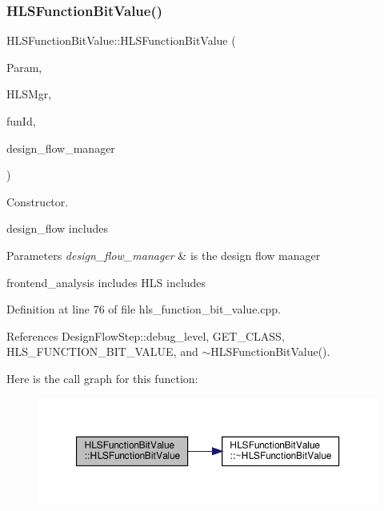 \subsubsection{\texorpdfstring{H\+L\+S\+Function\+Bit\+Value()}{HLSFunctionBitValue()}}
{\footnotesize\ttfamily H\+L\+S\+Function\+Bit\+Value\+::\+H\+L\+S\+Function\+Bit\+Value (\begin{DoxyParamCaption}\item[{const \hyperlink{Parameter_8hpp_a37841774a6fcb479b597fdf8955eb4ea}{Parameter\+Const\+Ref}}]{Param,  }\item[{const \hyperlink{hls__manager_8hpp_acd3842b8589fe52c08fc0b2fcc813bfe}{H\+L\+S\+\_\+manager\+Ref}}]{H\+L\+S\+Mgr,  }\item[{unsigned int}]{fun\+Id,  }\item[{const Design\+Flow\+Manager\+Const\+Ref}]{design\+\_\+flow\+\_\+manager }\end{DoxyParamCaption})}



Constructor. 

design\+\_\+flow includes


\begin{DoxyParams}{Parameters}
{\em design\+\_\+flow\+\_\+manager} & is the design flow manager\\
\hline
\end{DoxyParams}
frontend\+\_\+analysis includes H\+LS includes 

Definition at line 76 of file hls\+\_\+function\+\_\+bit\+\_\+value.\+cpp.



References Design\+Flow\+Step\+::debug\+\_\+level, G\+E\+T\+\_\+\+C\+L\+A\+SS, H\+L\+S\+\_\+\+F\+U\+N\+C\+T\+I\+O\+N\+\_\+\+B\+I\+T\+\_\+\+V\+A\+L\+UE, and $\sim$\+H\+L\+S\+Function\+Bit\+Value().

Here is the call graph for this function\+:
\nopagebreak
\begin{figure}[H]
\begin{center}
\leavevmode
\includegraphics[width=350pt]{d5/d41/classHLSFunctionBitValue_a26534e8d7235d679fc527d3085722541_cgraph}
\end{center}
\end{figure}
\mbox{\label{classHLSFunctionBitValue_acdb33308c741c3d7593a26e4fb573952}} 
